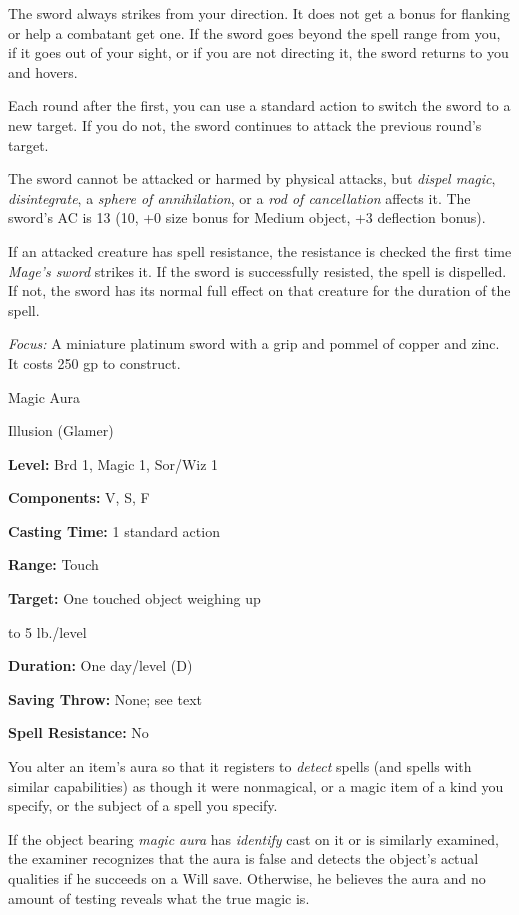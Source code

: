 \documentclass{article}
\begin{document}
The sword always strikes from your direction. It does not get a bonus for flanking 
or help a combatant get one. If the sword goes beyond the spell range from you, 
if it goes out of your sight, or if you are not directing it, the sword returns 
to you and hovers.

Each round after the first, you can use a standard action to switch the sword to 
a new target. If you do not, the sword continues to attack the previous round's 
target.

The sword cannot be attacked or harmed by physical attacks, but \textit{dispel 
magic}, \textit{disintegrate}, a \textit{sphere of annihilation}, or a \textit{rod 
of cancellation }affects it. The sword's AC is 13 (10, +0 size bonus for Medium 
object, +3 deflection bonus).

If an attacked creature has spell resistance, the resistance is checked the first 
time \textit{Mage's sword }strikes it. If the sword is successfully resisted, the 
spell is dispelled. If not, the sword has its normal full effect on that creature 
for the duration of the spell.

\textit{Focus: }A miniature platinum sword with a grip and pommel of copper and 
zinc. It costs 250 gp to construct.

\vspace{12pt}
Magic Aura

Illusion (Glamer)

\textbf{Level:} Brd 1, Magic 1, Sor/Wiz 1

\textbf{Components:} V, S, F

\textbf{Casting Time:} 1 standard action

\textbf{Range:} Touch

\textbf{Target:} One touched object weighing up

to 5 lb./level

\textbf{Duration:} One day/level (D)

\textbf{Saving Throw:} None; see text

\textbf{Spell Resistance:} No

You alter an item's aura so that it registers to \textit{detect }spells (and spells 
with similar capabilities) as though it were nonmagical, or a magic item of a kind 
you specify, or the subject of a spell you specify. 

If the object bearing \textit{magic aura }has \textit{identify }cast on it or is 
similarly examined, the examiner recognizes that the aura is false and detects 
the object's actual qualities if he succeeds on a Will save. Otherwise, he believes 
the aura and no amount of testing reveals what the true magic is.
\end{document}
